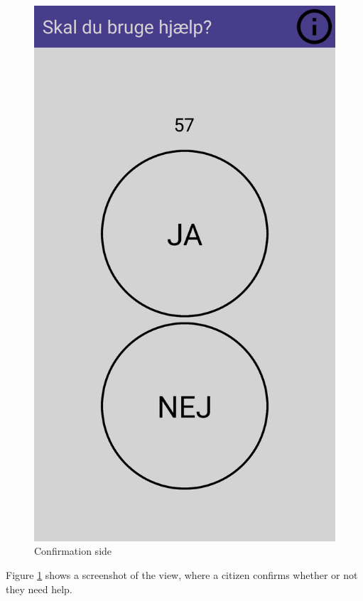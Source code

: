 \begin{figure}[ht]
    \centering
    \includegraphics[scale=0.1]{Figures/usabapp.png}
    \caption{Confirmation side}
    \label{fig:usabapp}
\end{figure}

Figure \ref{fig:usabapp} shows a screenshot of the view, where a citizen confirms whether or not they need help.

